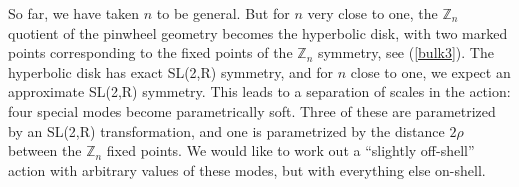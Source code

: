 \documentclass[12pt]{article}
\newcommand{\be}{\begin{equation}}
\newcommand{\ee}{\end{equation}}
\numberwithin{equation}{section}
\begin{document}

So far, we have taken $n$ to be general. But for $n$ very close to one, the $\mathbb{Z}_n$ quotient of the pinwheel geometry becomes the hyperbolic disk, with two marked points corresponding to the fixed points of the $\mathbb{Z}_n$ symmetry, see (\ref{bulk3}). The hyperbolic disk has exact SL(2,R) symmetry, and for $n$ close to one, we expect an approximate SL(2,R) symmetry. This leads to a separation of scales in the action: four special modes become parametrically soft. Three of these are parametrized by an SL(2,R) transformation, and one is parametrized by the distance $2\rho$ between the $\mathbb{Z}_n$ fixed points. We would like to work out a ``slightly off-shell'' action with arbitrary values of these modes, but with everything else on-shell.
\end{document}
